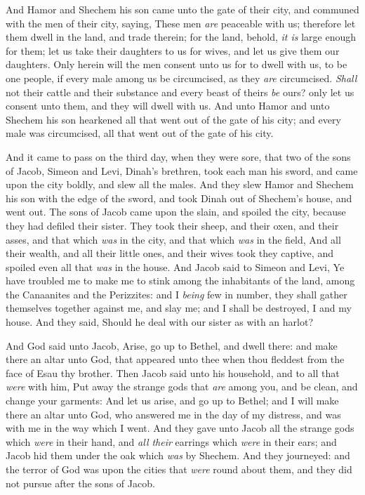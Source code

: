 \documentclass[11pt,letterpaper,oneside]{memoir}
\begin{document}
And Hamor and Shechem his son came unto the gate of their city, and
communed with the men of their city, saying, These men \emph{are}
peaceable with us; therefore let them dwell in the land, and trade
therein; for the land, behold, \emph{it is} large enough for them; let
us take their daughters to us for wives, and let us give them our
daughters. Only herein will the men consent unto us for to dwell with
us, to be one people, if every male among us be circumcised, as they
\emph{are} circumcised. \emph{Shall} not their cattle and their
substance and every beast of theirs \emph{be} ours? only let us consent
unto them, and they will dwell with us. And unto Hamor and unto Shechem
his son hearkened all that went out of the gate of his city; and every
male was circumcised, all that went out of the gate of his city.

And it came to pass on the third day, when they were sore, that two of
the sons of Jacob, Simeon and Levi, Dinah's brethren, took each man his
sword, and came upon the city boldly, and slew all the males. And they
slew Hamor and Shechem his son with the edge of the sword, and took
Dinah out of Shechem's house, and went out. The sons of Jacob came upon
the slain, and spoiled the city, because they had defiled their sister.
They took their sheep, and their oxen, and their asses, and that which
\emph{was} in the city, and that which \emph{was} in the field, And all
their wealth, and all their little ones, and their wives took they
captive, and spoiled even all that \emph{was} in the house. And Jacob
said to Simeon and Levi, Ye have troubled me to make me to stink among
the inhabitants of the land, among the Canaanites and the Perizzites:
and I \emph{being} few in number, they shall gather themselves together
against me, and slay me; and I shall be destroyed, I and my house. And
they said, Should he deal with our sister as with an harlot?

And God said unto Jacob, Arise, go up to Bethel, and dwell there: and
make there an altar unto God, that appeared unto thee when thou fleddest
from the face of Esau thy brother. Then Jacob said unto his household,
and to all that \emph{were} with him, Put away the strange gods that
\emph{are} among you, and be clean, and change your garments: And let us
arise, and go up to Bethel; and I will make there an altar unto God, who
answered me in the day of my distress, and was with me in the way which
I went. And they gave unto Jacob all the strange gods which \emph{were}
in their hand, and \emph{all their} earrings which \emph{were} in their
ears; and Jacob hid them under the oak which \emph{was} by Shechem. And
they journeyed: and the terror of God was upon the cities that
\emph{were} round about them, and they did not pursue after the sons of
Jacob.
\end{document}
